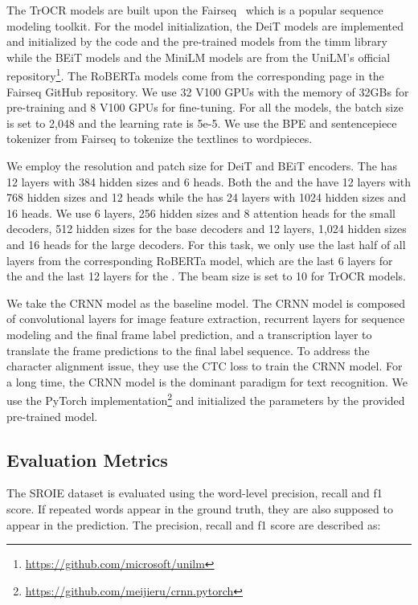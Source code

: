 \documentclass[letterpaper]{article} \usepackage{aaai23}  \usepackage{times}  \usepackage{helvet}  \usepackage{courier}  \usepackage[hyphens]{url}  \usepackage{graphicx} \urlstyle{rm} \def\UrlFont{\rm}  \usepackage{natbib}  \usepackage{caption} \frenchspacing  \setlength{\pdfpagewidth}{8.5in} \setlength{\pdfpageheight}{11in} \usepackage{algorithm}
\begin{document}
The TrOCR models are built upon the Fairseq~\cite{ott2019fairseq} which is a popular sequence modeling toolkit. For the model initialization, the DeiT models are implemented and initialized by the code and the pre-trained models from the timm library \cite{rw2019timm} while the BEiT models and the MiniLM models are from the UniLM’s official repository\footnote{\tiny\url{https://github.com/microsoft/unilm}}. The RoBERTa models come from the corresponding page in the Fairseq GitHub repository.
We use 32 V100 GPUs with the memory of 32GBs for pre-training and 8 V100 GPUs for fine-tuning. For all the models, the batch size is set to 2,048 and the learning rate is 5e-5. We use the BPE and sentencepiece tokenizer from Fairseq to tokenize the textlines to wordpieces.

We employ the  resolution and  patch size for DeiT and BEiT encoders. The  has 12 layers with 384 hidden sizes and 6 heads. Both the  and the  have 12 layers with 768 hidden sizes and 12 heads while the  has 24 layers with 1024 hidden sizes and 16 heads.
We use 6 layers, 256 hidden sizes and 8 attention heads for the small decoders, 512 hidden sizes for the base decoders and 12 layers, 1,024 hidden sizes and 16 heads for the large decoders. For this task, we only use the last half of all layers from the corresponding RoBERTa model, which are the last 6 layers for the  and the last 12 layers for the . The beam size is set to 10 for TrOCR models.


We take the CRNN model \cite{shi2016end} as the baseline model. The CRNN model is composed of convolutional layers for image feature extraction, recurrent layers for sequence modeling and the final frame label prediction, and a transcription layer to translate the frame predictions to the final label sequence. To address the character alignment issue, they use the CTC loss to train the CRNN model. 
For a long time, the CRNN model is the dominant paradigm for text recognition.
We use the PyTorch implementation\footnote{\tiny\url{https://github.com/meijieru/crnn.pytorch}} and initialized the parameters by the provided pre-trained model. 

\subsection{Evaluation Metrics}
The SROIE dataset is evaluated using the word-level precision, recall and f1 score. If repeated words appear in the ground truth, they are also supposed to appear in the prediction. The precision, recall and f1 score are described as:
\end{document}
